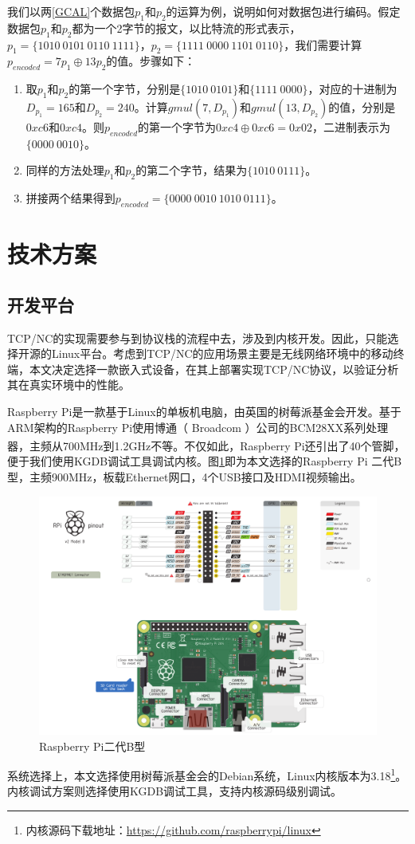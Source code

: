 \par
我们以两\ref{GCAL}个数据包$p_{1}$和$p_{2}$的运算为例，说明如何对数据包进行编码。假定数据包$p_{1}$和$p_{2}$都为一个2字节的报文，以比特流的形式表示，$p_{1}=\{1010\ 0101\ 0110\ 1111\}$，$p_{2}=\{1111\ 0000\ 1101\ 0110\}$，我们需要计算$p_{encoded}=7p_{1} \oplus 13p_{2}$的值。步骤如下：
\begin{enumerate}[fullwidth,itemindent=2em,label=(\arabic*)]
	\item 取$p_{1}$和$p_{2}$的第一个字节，分别是$\{1010\ 0101\}$和$\{1111\ 0000\}$，对应的十进制为$D_{p_1}=165$和$D_{p_2}=240$。计算$gmul\left(7,D_{p_1}\right)$和$gmul\left(13,D_{p_2}\right)$的值，分别是$0xc6$和$0xc4$。则$p_{encoded}$的第一个字节为$0xc4 \oplus 0xc6=0x02$，二进制表示为$\{0000\ 0010\}$。
	\item 同样的方法处理$p_{1}$和$p_{2}$的第二个字节，结果为$\{1010\ 0111\}$。
	\item 拼接两个结果得到$p_{encoded}=\{0000\ 0010\ 1010\ 0111\}$。
\end{enumerate}
\section{技术方案}
\subsection{开发平台}
TCP/NC的实现需要参与到协议栈的流程中去，涉及到内核开发。因此，只能选择开源的Linux平台。考虑到TCP/NC的应用场景主要是无线网络环境中的移动终端，本文决定选择一款嵌入式设备，在其上部署实现TCP/NC协议，以验证分析其在真实环境中的性能。
\par
Raspberry Pi是一款基于Linux的单板机电脑，由英国的树莓派基金会开发。基于ARM架构的Raspberry Pi使用博通（ Broadcom ）公司的BCM28XX系列处理器，主频从700MHz到1.2GHz不等\textsuperscript{\cite{rasp}}。不仅如此，Raspberry Pi还引出了40个管脚，便于我们使用KGDB调试工具调试内核。图\ref{RASP_EPS}即为本文选择的Raspberry Pi 二代B型，主频900MHz，板载Ethernet网口，4个USB接口及HDMI视频输出。
\begin{figure}[htbp]
	\centering
\includegraphics[width=6in]{figures/rasp.pdf}
\caption{Raspberry Pi二代B型}
\label{RASP_EPS}
\end{figure}
系统选择上，本文选择使用树莓派基金会的Debian系统，Linux内核版本为3.18\footnote{内核源码下载地址：\url{https://github.com/raspberrypi/linux}}。内核调试方案则选择使用KGDB调试工具，支持内核源码级别调试。
